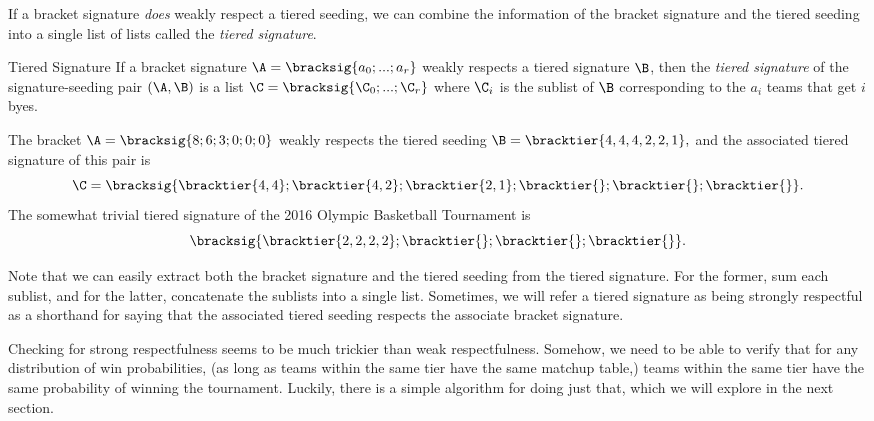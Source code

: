 {    

    If a bracket signature \textit{does} weakly respect a tiered seeding, we can combine the information of the bracket signature and the tiered seeding into a single list of lists called the \textit{tiered signature}.

    \begin{definition}{Tiered Signature}{}
        If a bracket signature $\A = \bracksig{a_0; ...; a_r}$ weakly respects a tiered signature $\B$, then the \textit{tiered signature} of the signature-seeding pair $(\A, \B)$ is a list $\C = \bracksig{\C_0; ...; \C_r}$ where $\C_i$ is the sublist of $\B$ corresponding to the $a_i$ teams that get $i$ byes.
    \end{definition}

    The bracket $\A = \bracksig{8;6;3;0;0;0}$ weakly respects the tiered seeding $\B = \bracktier{4,4,4,2,2,1},$ and the associated tiered signature of this pair is $$\C = \bracksig{\bracktier{4, 4};\bracktier{4,2};\bracktier{2,1};\bracktier{};\bracktier{};\bracktier{}}.$$ The somewhat trivial tiered signature of the 2016 Olympic Basketball Tournament is $$\bracksig{\bracktier{2, 2, 2, 2};\bracktier{};\bracktier{};\bracktier{}}.$$

    Note that we can easily extract both the bracket signature and the tiered seeding from the tiered signature. For the former, sum each sublist, and for the latter, concatenate the sublists into a single list. Sometimes, we will refer a tiered signature as being strongly respectful as a shorthand for saying that the associated tiered seeding respects the associate bracket signature.

    Checking for strong respectfulness seems to be much trickier than weak respectfulness. Somehow, we need to be able to verify that for any distribution of win probabilities, (as long as teams within the same tier have the same matchup table,) teams within the same tier have the same probability of winning the tournament. Luckily, there is a simple algorithm for doing just that, which we will explore in the next section.
}